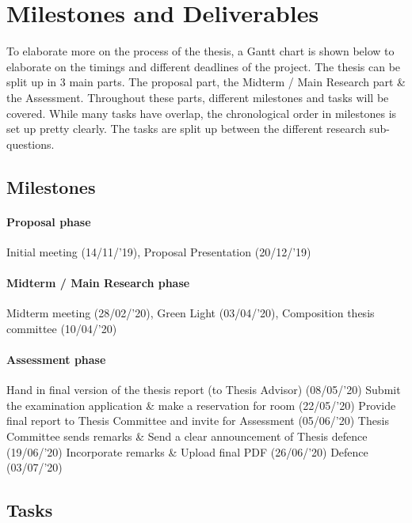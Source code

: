 \section{Milestones and Deliverables}
To elaborate more on the process of the thesis, a Gantt chart is shown below to elaborate on the timings and different deadlines of the project. The thesis can be split up in 3 main parts. The proposal part, the Midterm / Main Research part \& the Assessment. Throughout these parts, different milestones and tasks will be covered. While many tasks have overlap, the chronological order in milestones is set up pretty clearly. The tasks are split up between the different research sub-questions. 

\subsection{Milestones}
\paragraph{Proposal phase}
Initial meeting (14/11/'19), Proposal Presentation (20/12/'19)
\paragraph{Midterm / Main Research phase}
Midterm meeting (28/02/'20), Green Light (03/04/'20), Composition thesis committee (10/04/'20)

\paragraph{Assessment phase}
\begin{outline}
\1 Hand in final version of the thesis report (to Thesis Advisor) (08/05/'20)
\1 Submit the examination application \& make a reservation for room (22/05/'20)
\1 Provide final report to Thesis Committee and invite for Assessment (05/06/'20)
\1 Thesis Committee sends remarks \& Send a clear announcement of Thesis defence (19/06/'20)
\1 Incorporate remarks \& Upload final PDF (26/06/'20)
\1 Defence (03/07/'20)
\end{outline}


\subsection{Tasks}
